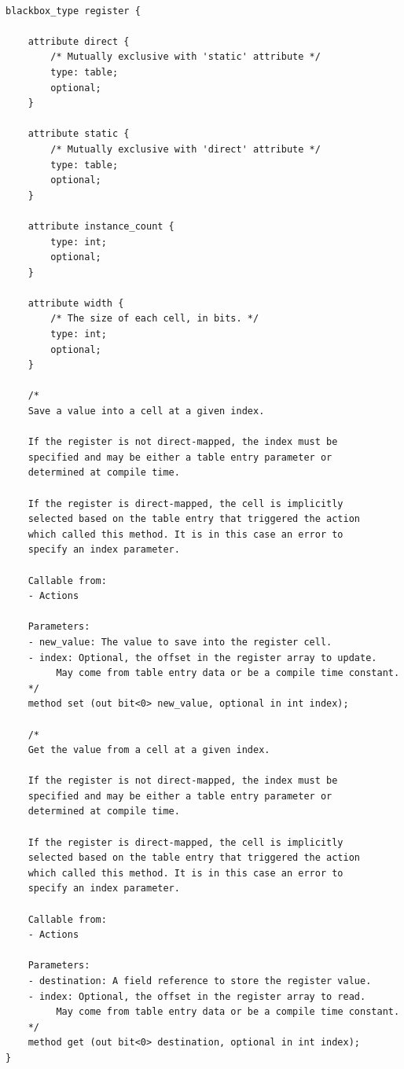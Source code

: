 \documentclass[12pt]{article}
\begin{document}
\begin{lstlisting}[style=P4style]

blackbox_type register {
        
    attribute direct {
        /* Mutually exclusive with 'static' attribute */
        type: table;
        optional;
    }

    attribute static {
        /* Mutually exclusive with 'direct' attribute */
        type: table;
        optional;
    }

    attribute instance_count {
        type: int;
        optional;
    }

    attribute width {
        /* The size of each cell, in bits. */
        type: int;
        optional;
    }

    /*
    Save a value into a cell at a given index.

    If the register is not direct-mapped, the index must be
    specified and may be either a table entry parameter or
    determined at compile time.

    If the register is direct-mapped, the cell is implicitly
    selected based on the table entry that triggered the action
    which called this method. It is in this case an error to
    specify an index parameter.
    
    Callable from:
    - Actions

    Parameters:
    - new_value: The value to save into the register cell.
    - index: Optional, the offset in the register array to update.
         May come from table entry data or be a compile time constant.
    */
    method set (out bit<0> new_value, optional in int index);

    /*
    Get the value from a cell at a given index.

    If the register is not direct-mapped, the index must be
    specified and may be either a table entry parameter or
    determined at compile time.

    If the register is direct-mapped, the cell is implicitly
    selected based on the table entry that triggered the action
    which called this method. It is in this case an error to
    specify an index parameter.
    
    Callable from:
    - Actions

    Parameters:
    - destination: A field reference to store the register value.
    - index: Optional, the offset in the register array to read.
         May come from table entry data or be a compile time constant.
    */
    method get (out bit<0> destination, optional in int index);
}
\end{lstlisting}
\end{document}
